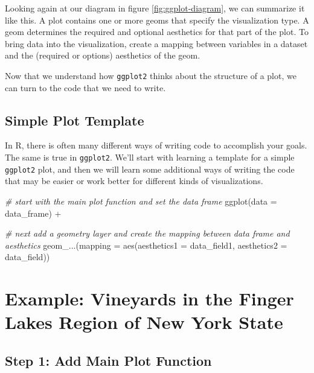\documentclass[
]{krantz}
\makeatletter
\newenvironment{Shaded}{\begin{snugshade}}{\end{snugshade}}
\newcommand{\AttributeTok}[1]{\textcolor[rgb]{0.61,0.61,0.61}{#1}}
\newcommand{\CommentTok}[1]{\textcolor[rgb]{0.37,0.37,0.37}{\textit{#1}}}
\newcommand{\FunctionTok}[1]{\textcolor[rgb]{0,0,0}{#1}}
\newcommand{\NormalTok}[1]{#1}
\newcommand{\SpecialCharTok}[1]{\textcolor[rgb]{0,0,0}{#1}}
\newenvironment{kframe}{%
\medskip{}
\setlength{\fboxsep}{.8em}
 \def\at@end@of@kframe{}%
 \ifinner\ifhmode%
  \def\at@end@of@kframe{\end{minipage}}%
  \begin{minipage}{\columnwidth}%
 \fi\fi%
 \def\FrameCommand##1{\hskip\@totalleftmargin \hskip-\fboxsep
 \colorbox{shadecolor}{##1}\hskip-\fboxsep
     \hskip-\linewidth \hskip-\@totalleftmargin \hskip\columnwidth}%
 \MakeFramed {\advance\hsize-\width
   \@totalleftmargin\z@ \linewidth\hsize
   \@setminipage}}%
 {\par\unskip\endMakeFramed%
 \at@end@of@kframe}
\renewenvironment{Shaded}{\begin{kframe}}{\end{kframe}}
\makeatother
\begin{document}
Looking again at our diagram in figure \ref{fig:ggplot-diagram}, we can summarize
it like this. A plot contains one or more geoms that specify the visualization type.
A geom determines the required and optional aesthetics for that part of the plot.
To bring data into the visualization, create a mapping between variables in a dataset
and the (required or options) aesthetics of the geom.

Now that we understand how \texttt{ggplot2} thinks about the structure of a plot, we can
turn to the code that we need to write.

\hypertarget{simple-plot-template}{%
\subsection{Simple Plot Template}\label{simple-plot-template}}

In R, there is often many different ways of writing code to accomplish your goals.
The same is true in \texttt{ggplot2}. We'll start with learning a template for a simple
\texttt{ggplot2} plot, and then we will learn some additional ways of writing the code
that may be easier or work better for different kinds of visualizations.

\begin{Shaded}
\begin{Highlighting}[]
\CommentTok{\# start with the main plot function and set the data frame}
\FunctionTok{ggplot}\NormalTok{(}\AttributeTok{data =}\NormalTok{ data\_frame) }\SpecialCharTok{+} 
  
\CommentTok{\# next add a geometry layer and create the mapping between data frame and aesthetics}
  \FunctionTok{geom\_...}\NormalTok{(}\AttributeTok{mapping =} \FunctionTok{aes}\NormalTok{(}\AttributeTok{aesthetics1 =}\NormalTok{ data\_field1, }\AttributeTok{aesthetics2 =}\NormalTok{ data\_field))}
\end{Highlighting}
\end{Shaded}

\hypertarget{example-vineyards-in-the-finger-lakes-region-of-new-york-state}{%
\section{Example: Vineyards in the Finger Lakes Region of New York State}\label{example-vineyards-in-the-finger-lakes-region-of-new-york-state}}

\hypertarget{step-1-add-main-plot-function}{%
\subsection{Step 1: Add Main Plot Function}\label{step-1-add-main-plot-function}}
\end{document}
